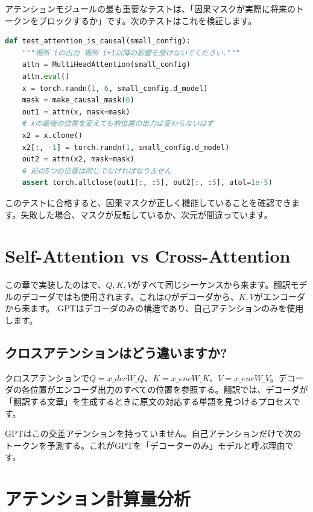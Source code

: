 アテンションモジュールの最も重要なテストは、「因果マ​​スクが実際に将来のトークンをブロックするか」です。次のテストはこれを検証します。

\begin{lstlisting}[language=Python]
def test_attention_is_causal(small_config):
    """場所 iの出力 場所 i+1以降の影響を受けないでください."""
    attn = MultiHeadAttention(small_config)
    attn.eval()
    x = torch.randn(1, 6, small_config.d_model)
    mask = make_causal_mask(6)
    out1 = attn(x, mask=mask)
    # xの最後の位置を変えても前位置の出力は変わらないはず
    x2 = x.clone()
    x2[:, -1] = torch.randn(1, small_config.d_model)
    out2 = attn(x2, mask=mask)
    # 前の5つの位置は同じでなければなりません
    assert torch.allclose(out1[:, :5], out2[:, :5], atol=1e-5)
\end{lstlisting}

このテストに合格すると、因果マスクが正しく機能していることを確認できます。失敗した場合、マスクが反転しているか、次元が間違っています。

\section{Self-Attention vs Cross-Attention}

この章で実装したのはで、$Q, K, V$がすべて同じシーケンスから来ます。翻訳モデルのデコーダではも使用されます。これは$Q$がデコーダから、$K, V$がエンコーダから来ます。 GPTはデコーダのみの構造であり、自己アテンションのみを使用します。

\subsection{クロスアテンションはどう違いますか?}

クロスアテンションで$Q = x\_{dec} W\_Q$、$K = x\_{enc} W\_K$、$V = x\_{enc} W\_V$。デコーダの各位置がエンコーダ出力のすべての位置を参照する。翻訳では、デコーダが「翻訳する文章」を生成するときに原文の対応する単語を見つけるプロセスです。

GPTはこの交差アテンションを持っていません。自己アテンションだけで次のトークンを予測する。これがGPTを「デコーターのみ」モデルと呼ぶ理由です。

\section{アテンション計算量分析}

